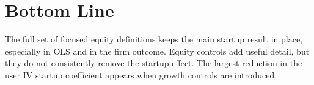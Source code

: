 \documentclass{article}
\newcommand{\cleanedresultsdir}{../results/cleaned/tex}
\newcommand{\TableInput}[2][\linewidth]{}
\begin{document}
\begin{table}[H]
  \centering
  \caption{Individual Productivity Mechanisms}
  \TableInput{\cleanedresultsdir/llm_equity_pi_followups_horse_race.tex}
\end{table}

\section*{Bottom Line}
The full set of focused equity definitions keeps the main startup result in place, especially in OLS and in the firm outcome.
Equity controls add useful detail, but they do not consistently remove the startup effect.
The largest reduction in the user IV startup coefficient appears when growth controls are introduced.
\end{document}
